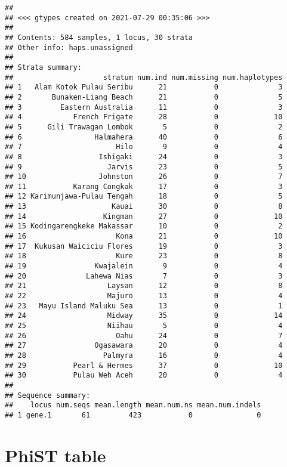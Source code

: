 \documentclass[
]{article}
\begin{document}
\begin{verbatim}
## 
## <<< gtypes created on 2021-07-29 00:35:06 >>>
## 
## Contents: 584 samples, 1 locus, 30 strata
## Other info: haps.unassigned
## 
## Strata summary:
##                     stratum num.ind num.missing num.haplotypes
## 1   Alam Kotok Pulau Seribu      21           0              3
## 2       Bunaken-Liang Beach      21           0              5
## 3         Eastern Australia      11           0              3
## 4            French Frigate      28           0             10
## 5      Gili Trawagan Lombok       5           0              2
## 6                 Halmahera      40           0              6
## 7                      Hilo       9           0              4
## 8                  Ishigaki      24           0              3
## 9                    Jarvis      23           0              5
## 10                 Johnston      26           0              7
## 11           Karang Congkak      17           0              3
## 12 Karimunjawa-Pulau Tengah      18           0              5
## 13                    Kauai      30           0              8
## 14                  Kingman      27           0             10
## 15 Kodingarengkeke Makassar      10           0              2
## 16                     Kona      21           0             10
## 17  Kukusan Waiciciu Flores      19           0              3
## 18                     Kure      23           0              8
## 19                Kwajalein       9           0              4
## 20              Lahewa Nias       7           0              3
## 21                   Laysan      12           0              8
## 22                   Majuro      13           0              4
## 23   Mayu Island Maluku Sea      13           0              1
## 24                   Midway      35           0             14
## 25                   Niihau       5           0              4
## 26                     Oahu      24           0              7
## 27                Ogasawara      20           0              4
## 28                  Palmyra      16           0              4
## 29           Pearl & Hermes      37           0             10
## 30           Pulau Weh Aceh      20           0              4
## 
## Sequence summary:
##    locus num.seqs mean.length mean.num.ns mean.num.indels
## 1 gene.1       61         423           0               0
\end{verbatim}

\hypertarget{phist-table}{%
\section{PhiST table}\label{phist-table}}
\end{document}
